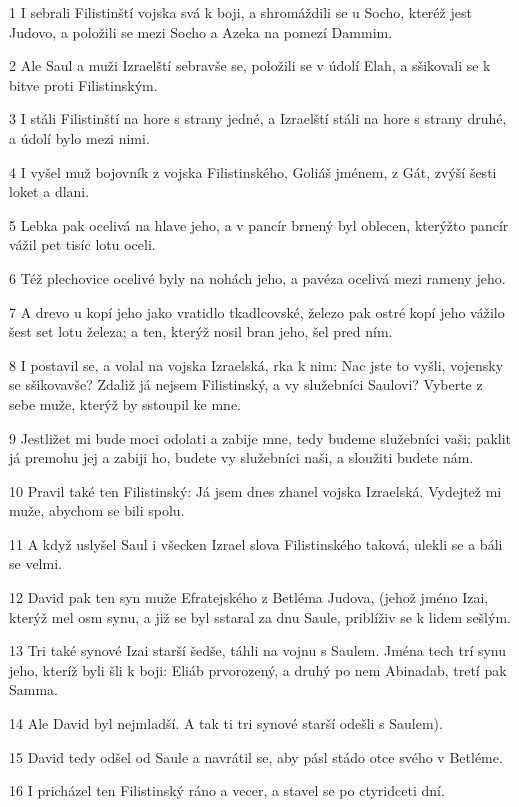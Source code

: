 \par 1 I sebrali Filistinští vojska svá k boji, a shromáždili se u Socho, kteréž jest Judovo, a položili se mezi Socho a Azeka na pomezí Dammim.
\par 2 Ale Saul a muži Izraelští sebravše se, položili se v údolí Elah, a sšikovali se k bitve proti Filistinským.
\par 3 I stáli Filistinští na hore s strany jedné, a Izraelští stáli na hore s strany druhé, a údolí bylo mezi nimi.
\par 4 I vyšel muž bojovník z vojska Filistinského, Goliáš jménem, z Gát, zvýší šesti loket a dlani.
\par 5 Lebka pak ocelivá na hlave jeho, a v pancír brnený byl oblecen, kterýžto pancír vážil pet tisíc lotu oceli.
\par 6 Též plechovice ocelivé byly na nohách jeho, a pavéza ocelivá mezi rameny jeho.
\par 7 A drevo u kopí jeho jako vratidlo tkadlcovské, železo pak ostré kopí jeho vážilo šest set lotu železa; a ten, kterýž nosil bran jeho, šel pred ním.
\par 8 I postavil se, a volal na vojska Izraelská, rka k nim: Nac jste to vyšli, vojensky se sšikovavše? Zdaliž já nejsem Filistinský, a vy služebníci Saulovi? Vyberte z sebe muže, kterýž by sstoupil ke mne.
\par 9 Jestližet mi bude moci odolati a zabije mne, tedy budeme služebníci vaši; paklit já premohu jej a zabiji ho, budete vy služebníci naši, a sloužiti budete nám.
\par 10 Pravil také ten Filistinský: Já jsem dnes zhanel vojska Izraelská. Vydejtež mi muže, abychom se bili spolu.
\par 11 A když uslyšel Saul i všecken Izrael slova Filistinského taková, ulekli se a báli se velmi.
\par 12 David pak ten syn muže Efratejského z Betléma Judova, (jehož jméno Izai, kterýž mel osm synu, a již se byl sstaral za dnu Saule, priblíživ se k lidem sešlým.
\par 13 Tri také synové Izai starší šedše, táhli na vojnu s Saulem. Jména tech trí synu jeho, kteríž byli šli k boji: Eliáb prvorozený, a druhý po nem Abinadab, tretí pak Samma.
\par 14 Ale David byl nejmladší. A tak ti tri synové starší odešli s Saulem).
\par 15 David tedy odšel od Saule a navrátil se, aby pásl stádo otce svého v Betléme.
\par 16 I pricházel ten Filistinský ráno a vecer, a stavel se po ctyridceti dní.
